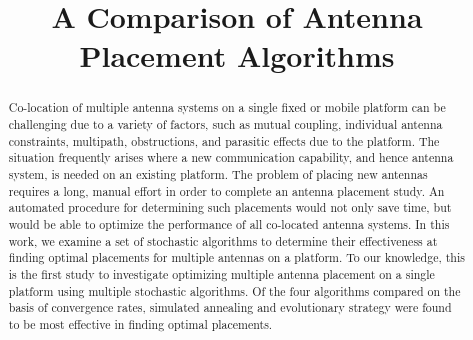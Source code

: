 \documentclass[conference]{IEEEtran}
\begin{document}
%
\title{A Comparison of Antenna Placement Algorithms\vspace{-3ex}}

\author{
}
\maketitle
\begin{abstract}
Co-location of multiple antenna systems on a single fixed or mobile platform can be challenging due to a variety of factors, such as mutual coupling, individual antenna constraints, multipath, obstructions, and parasitic effects due to the platform. The situation frequently arises where a new communication capability, and hence antenna system, is needed on an existing platform. The problem of placing new antennas requires a long, manual effort in order to complete an antenna placement study. An automated procedure for determining such placements would not only save time, but would be able to optimize the performance of all co-located antenna systems. In this work, we examine a set of stochastic algorithms to determine their effectiveness at finding optimal placements for multiple antennas on a platform. To our knowledge, this is the first study to investigate optimizing multiple antenna placement on a single platform using multiple stochastic algorithms. Of the four algorithms compared on the basis of convergence rates, simulated annealing and evolutionary strategy were found to be most effective in finding optimal placements.
\end{abstract}


%
\IEEEpeerreviewmaketitle
\end{document}
